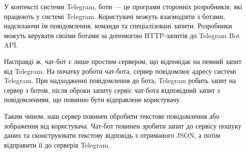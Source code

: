 У контексті системи Telegram, боти — це програми сторонніх розробників,
які працюють у системі Telegram.
Користувачі можуть взаємодіяти з ботами, надсилаючи їм повідомлення,
команди та спеціалізовані запити.
Розробники можуть керувати своїми ботами за допомогою HTTP-запитів до Telegram Bot API.

Насправді ж, чат-бот є лише простим сервером, що відповідає на певний запит від Telegram.
На початку роботи чат-бота, сервер повідомлює адресу системі Telegram.
При надходженні повідомлення до бота, Telegram робить запит на сервер з ботом,
після оброки запиту сервіс чат-бота відповідний запит з повідомленням, що повинно бути
відправлене користувачу.

Таким чином, наш сервер повинен обробити текстове повідомлення або зображення від користувача.
Чат-бот повинен зробити запит до сервісу пошуку даних та сконструювати
текстову відповідь з отриманого JSON, а потім відправити її до серверів Telegram.
